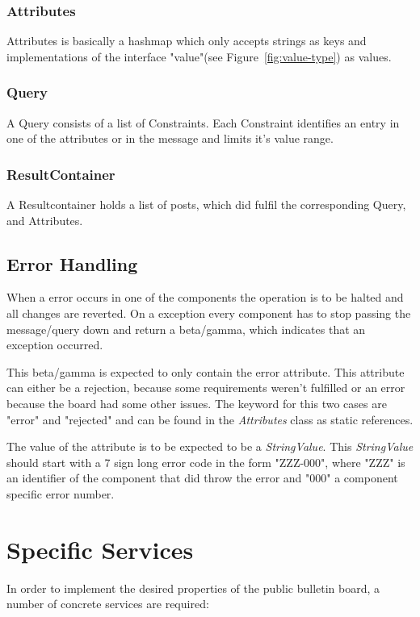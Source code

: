 \documentclass[oneside]{scrreprt}
\newcommand{\fig}[1]{Figure~\ref{#1}}
\begin{document}
\subsection{Attributes}
Attributes is basically a hashmap which only accepts strings as keys and implementations of the interface "value"(see \fig{fig:value-type}) as values.
\subsection{Query}
A Query consists of a list of Constraints. Each Constraint identifies an entry in one of the attributes or in the message and limits it's value range.
\subsection{ResultContainer}
A Resultcontainer holds a list of posts, which did fulfil the corresponding Query, and Attributes.
\section{Error Handling}
When a error occurs in one of the components the operation is to be halted and all changes are reverted. On a exception every component has to stop passing the message/query down and return a beta/gamma, which indicates that an exception occurred.

This beta/gamma is expected to only contain the error attribute. This attribute can either be a rejection, because some requirements weren't fulfilled or an error because the board had some other issues. The keyword for this two cases are "error" and "rejected" and can be found in the \emph{Attributes} class as static references.

The value of the attribute is to be expected to be a \emph{StringValue}. This \emph{StringValue} should start with a 7 sign long error code in the form "ZZZ-000", where "ZZZ" is an identifier of the component that did throw the error and "000" a component specific error number.

\chapter{Specific Services}

In order to implement the desired properties of the public bulletin board,
 a number of concrete services are required:
\end{document}
